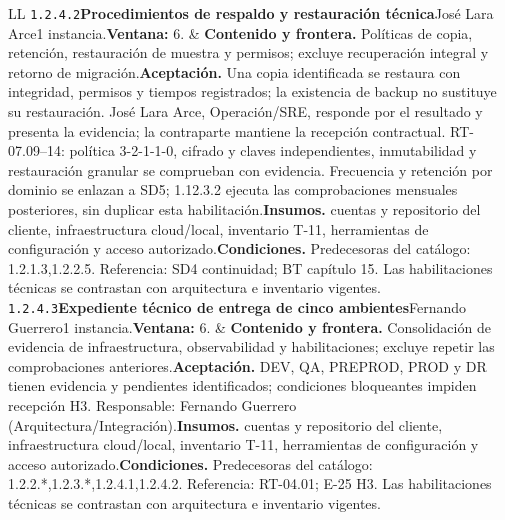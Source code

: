 \begin{longtable}{L{\tabcolsep\relax}L{\tabcolsep\relax}}
\texttt{1.\allowbreak{}2.\allowbreak{}4.\allowbreak{}2}\newline{}\textbf{Procedimientos de respaldo y restauración técnica}\newline{}José Lara Arce\newline{}1 instancia.\newline{}\textbf{Ventana:} 6. & \textbf{Contenido y frontera.} Políticas de copia, retención, restauración de muestra y permisos; excluye recuperación integral y retorno de migración.\newline{}\textbf{Aceptación.} Una copia identificada se restaura con integridad, permisos y tiempos registrados; la existencia de backup no sustituye su restauración. José Lara Arce, Operación/SRE, responde por el resultado y presenta la evidencia; la contraparte mantiene la recepción contractual. RT-07.09--14: política 3-2-1-1-0, cifrado y claves independientes, inmutabilidad y restauración granular se comprueban con evidencia. Frecuencia y retención por dominio se enlazan a SD5; 1.12.3.2 ejecuta las comprobaciones mensuales posteriores, sin duplicar esta habilitación.\newline{}\textbf{Insumos.} cuentas y repositorio del cliente, infraestructura cloud/local, inventario T-11, herramientas de configuración y acceso autorizado.\newline{}\textbf{Condiciones.} Predecesoras del catálogo: 1.2.1.3,1.2.2.5. Referencia: SD4 continuidad; BT capítulo 15. Las habilitaciones técnicas se contrastan con arquitectura e inventario vigentes.\\\hline
\texttt{1.\allowbreak{}2.\allowbreak{}4.\allowbreak{}3}\newline{}\textbf{Expediente técnico de entrega de cinco ambientes}\newline{}Fernando Guerrero\newline{}1 instancia.\newline{}\textbf{Ventana:} 6. & \textbf{Contenido y frontera.} Consolidación de evidencia de infraestructura, observabilidad y habilitaciones; excluye repetir las comprobaciones anteriores.\newline{}\textbf{Aceptación.} DEV, QA, PREPROD, PROD y DR tienen evidencia y pendientes identificados; condiciones bloqueantes impiden recepción H3. Responsable: Fernando Guerrero (Arquitectura/Integración).\newline{}\textbf{Insumos.} cuentas y repositorio del cliente, infraestructura cloud/local, inventario T-11, herramientas de configuración y acceso autorizado.\newline{}\textbf{Condiciones.} Predecesoras del catálogo: 1.2.2.*,1.2.3.*,1.2.4.1,1.2.4.2. Referencia: RT-04.01; E-25 H3. Las habilitaciones técnicas se contrastan con arquitectura e inventario vigentes.\\\hline
\end{longtable}\endgroup
